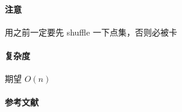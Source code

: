 \paragraph{注意} 用之前一定要先 shuffle 一下点集，否则必被卡

\paragraph{复杂度} 期望 \(O(n)\)

\paragraph{参考文献} \cite{welzl2005smallest}